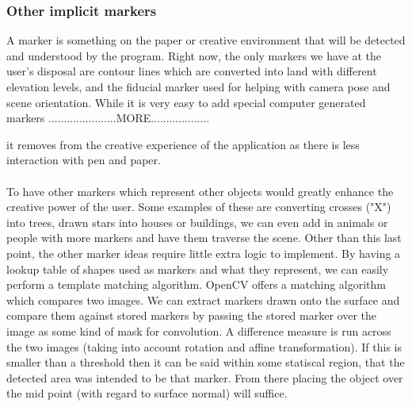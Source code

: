 \documentclass[11pt]{article}
\begin{document}
\subsubsection{Other implicit markers}
A marker is something on the paper or creative environment that will be 
detected and understood by the program. Right now, the only markers we have
at the user's disposal are contour lines which are converted into land with
different elevation levels, and the fiducial marker used for helping
with camera pose and scene orientation. While it is very easy to add 
special computer generated markers ......................MORE...................
 				
 		it removes from the creative experience of the application
as there is less interaction with pen and paper. \\
\\
To have other markers which represent other objects would greatly enhance the
creative power of the user. Some examples of these are converting crosses ("X")
into trees, drawn stars into houses or buildings, we can even add in animals 
or people with more markers and have them traverse the scene. Other than this
last point, the other marker ideas require little extra logic to implement.
By having a lookup table of shapes used as markers and what they represent, we
can easily perform a template matching algorithm. OpenCV offers a matching
algorithm which compares two images. We can extract markers drawn onto the
surface and compare them against stored markers by passing the stored marker
over the image as some kind of mask for convolution. A difference measure is run
across the two images (taking into account rotation and affine transformation).
If this is smaller than a threshold then it can be said within some statiscal
region, that the detected area was intended to be that marker. From there placing
the object over the mid point (with regard to surface normal) will suffice.
\end{document}
